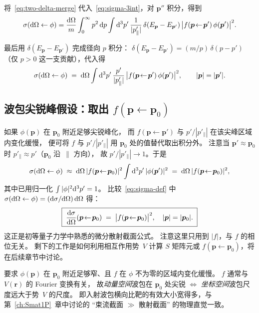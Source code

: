 将~\eqref{eq:two-delta-merge} 代入~\eqref{eq:sigma-3int}，对 $\bm{p}''$ 积分，得到
\begin{equation}
\sigma(\mathrm{d}\Omega \leftarrow \phi)
= \frac{\mathrm{d}\Omega}{m}\int_0^\infty p^2\,\mathrm{d} p \int \mathrm{d}^3 p'\,
\frac{1}{|p'_\parallel|}\,\delta(E_{\bm{p}}-E_{\bm{p}'})\,
\big|f(\bm{p}\!\leftarrow\!\bm{p}')\,\phi(\bm{p}')\big|^2.
\label{eq:sigma-mid}
\end{equation}

最后用 $\delta(E_{\bm{p}}-E_{\bm{p}'})$ 完成径向 $p$ 积分：
$\delta(E_{\bm{p}}-E_{\bm{p}'}) = (m/p)\,\delta(p-p')$（仅 $p>0$ 这一支贡献），代入得
\begin{equation}
\sigma(\mathrm{d}\Omega \leftarrow \phi)
\;=\; \mathrm{d}\Omega \int \mathrm{d}^3 p'\,\frac{p'}{|p'_\parallel|}\,
\big|f(\bm{p}\!\leftarrow\!\bm{p}')\,\phi(\bm{p}')\big|^2,
\qquad |\bm{p}| = |\bm{p}'|.
\label{eq:sigma-almost}
\end{equation}

\subsection{波包尖锐峰假设：取出 $f(\bm{p}\!\leftarrow\!\bm{p}_0)$}

如果 $\phi(\bm{p})$ 在 $\bm{p}_0$ 附近足够尖锐峰化，
而 $f(\bm{p}\!\leftarrow\!\bm{p}')$ 与 $p'/|p'_\parallel|$ 在该尖峰区域内变化缓慢，
便可将 $f$ 与 $p'/|p'_\parallel|$ 用 $\bm{p}_0$ 处的值替代取出积分外。
注意当 $\bm{p}' \approx \bm{p}_0$ 时 $p'_\parallel \approx p'$（$\bm{p}_0$ 沿~$\parallel$ 方向），
故 $p'/|p'_\parallel|\to 1$。于是
\begin{equation}
\sigma(\mathrm{d}\Omega \leftarrow \phi) \;\approx\; \mathrm{d}\Omega\,|f(\bm{p}\!\leftarrow\!\bm{p}_0)|^2
\int \mathrm{d}^3 p'\,|\phi(\bm{p}')|^2 \;=\; \mathrm{d}\Omega\,|f(\bm{p}\!\leftarrow\!\bm{p}_0)|^2,
\label{eq:sigma-final}
\end{equation}
其中已用归一化 $\int|\phi|^2\mathrm{d}^3 p' = 1$。
比较~\eqref{eq:sigma-def} 中 $\sigma(\mathrm{d}\Omega\leftarrow\phi) = (\mathrm{d}\sigma/\mathrm{d}\Omega)\,\mathrm{d}\Omega$ 得：
\begin{equation}
\boxed{\;\frac{\mathrm{d}\sigma}{\mathrm{d}\Omega}(\bm{p}\!\leftarrow\!\bm{p}_0) \;=\; \big|f(\bm{p}\!\leftarrow\!\bm{p}_0)\big|^2,\quad |\bm{p}|=|\bm{p}_0|.\;}
\label{eq:dsigma-domega}
\end{equation}
这正是初等量子力学中熟悉的微分散射截面公式。
注意这里只用到 $|f|$，与 $f$ 的相位无关。
剩下的工作是如何利用相互作用势~$V$ 计算 $S$ 矩阵元或 $f(\bm{p}\!\leftarrow\!\bm{p}_0)$，将在后续章节中讨论。

\begin{remark}[尖锐峰假设的含义]
要求 $\phi(\bm{p})$ 在 $\bm{p}_0$ 附近足够窄、且 $f$ 在 $\phi$ 不为零的区域内变化缓慢。
$f$ 通常与 $V(\bm{r})$ 的 Fourier 变换有关，
故\emph{动量空间}波包在 $\bm{p}_0$ 处尖锐 $\Leftrightarrow$ \emph{坐标空间}波包尺度远大于势~$V$ 的尺度。
即入射波包横向比靶的有效大小宽得多，与第~\ref{ch:Smat1P}~章中讨论的 “束流截面 $\gg$ 散射截面” 的物理直觉一致。
\end{remark}

